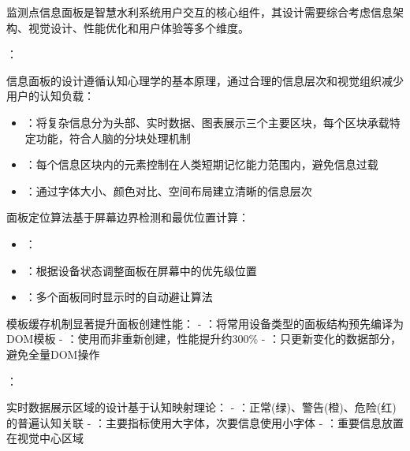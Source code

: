 
监测点信息面板是智慧水利系统用户交互的核心组件，其设计需要综合考虑信息架构、视觉设计、性能优化和用户体验等多个维度。

：


信息面板的设计遵循认知心理学的基本原理，通过合理的信息层次和视觉组织减少用户的认知负载：

\begin{itemize}
\tightlist
\item
  ：将复杂信息分为头部、实时数据、图表展示三个主要区块，每个区块承载特定功能，符合人脑的分块处理机制
\item
  ：每个信息区块内的元素控制在人类短期记忆能力范围内，避免信息过载
\item
  ：通过字体大小、颜色对比、空间布局建立清晰的信息层次
\end{itemize}


面板定位算法基于屏幕边界检测和最优位置计算：

\begin{itemize}
\tightlist
\item
  ：
\item
  ：根据设备状态调整面板在屏幕中的优先级位置
\item
  ：多个面板同时显示时的自动避让算法
\end{itemize}


模板缓存机制显著提升面板创建性能： - ：将常用设备类型的面板结构预先编译为DOM模板 - ：使用而非重新创建，性能提升约300\% - ：只更新变化的数据部分，避免全量DOM操作

：


实时数据展示区域的设计基于认知映射理论： - ：正常(绿)、警告(橙)、危险(红)的普遍认知关联 - ：主要指标使用大字体，次要信息使用小字体 - ：重要信息放置在视觉中心区域

